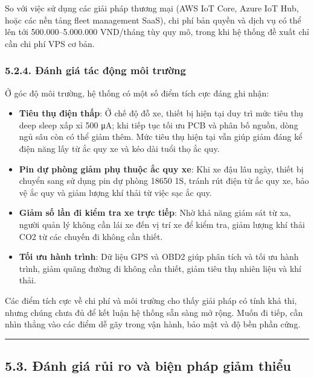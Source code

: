 \documentclass[a4paper]{extarticle}
\providecommand{\tightlist}{%
  \setlength{\itemsep}{0pt}\setlength{\parskip}{0pt}}
\begin{document}
So với việc sử dụng các giải pháp thương mại (AWS IoT Core, Azure IoT
Hub, hoặc các nền tảng fleet management SaaS), chi phí bản quyền và dịch
vụ có thể lên tới 500.000--5.000.000 VND/tháng tùy quy mô, trong khi hệ
thống đề xuất chỉ cần chi phí VPS cơ bản.

\subsubsection{5.2.4. Đánh giá tác động môi
trường}\label{524-ux111uxe1nh-giuxe1-tuxe1c-ux111ux1ed9ng-muxf4i-trux1b0ux1eddng}

Ở góc độ môi trường, hệ thống có một số điểm tích cực đáng ghi nhận:

\begin{itemize}
\tightlist
\item
  \textbf{Tiêu thụ điện thấp}: Ở chế độ đỗ xe, thiết bị hiện tại duy trì
  mức tiêu thụ deep sleep xấp xỉ 500 μA; khi tiếp tục tối ưu PCB và phân
  bố nguồn, dòng ngủ sâu còn có thể giảm thêm. Mức tiêu thụ hiện tại vẫn
  giúp giảm đáng kể điện năng lấy từ ắc quy xe và kéo dài tuổi thọ ắc
  quy.
\item
  \textbf{Pin dự phòng giảm phụ thuộc ắc quy xe}: Khi xe đậu lâu ngày,
  thiết bị chuyển sang sử dụng pin dự phòng 18650 1S, tránh rút điện từ
  ắc quy xe, bảo vệ ắc quy và giảm lượng khí thải từ việc sạc ắc quy.
\item
  \textbf{Giảm số lần đi kiểm tra xe trực tiếp}: Nhờ khả năng giám sát
  từ xa, người quản lý không cần lái xe đến vị trí xe để kiểm tra, giảm
  lượng khí thải CO2 từ các chuyến đi không cần thiết.
\item
  \textbf{Tối ưu hành trình}: Dữ liệu GPS và OBD2 giúp phân tích và tối
  ưu hành trình, giảm quãng đường đi không cần thiết, giảm tiêu thụ
  nhiên liệu và khí thải.
\end{itemize}

Các điểm tích cực về chi phí và môi trường cho thấy giải pháp có tính
khả thi, nhưng chúng chưa đủ để kết luận hệ thống sẵn sàng mở rộng.
Muốn đi tiếp, cần nhìn thẳng vào các điểm dễ gãy trong vận hành, bảo mật
và độ bền phần cứng.

\begin{center}\rule{0.5\linewidth}{0.5pt}\end{center}

\subsection{5.3. Đánh giá rủi ro và biện pháp giảm
thiểu}\label{53-ux111uxe1nh-giuxe1-rux1ee7i-ro-vuxe0-biux1ec7n-phuxe1p-giux1ea3m-thiux1ec3u}
\end{document}
